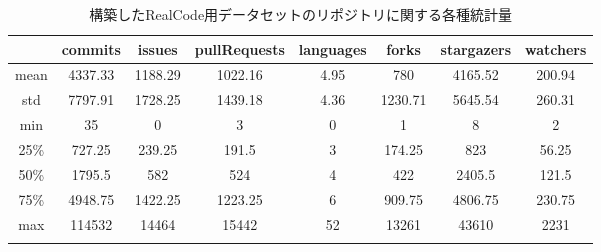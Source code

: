 \begin{table}[t]
  \centering
  \caption{構築したRealCode用データセットのリポジトリに関する各種統計量}
  \label{table:stats_repos}
    
  \begin{tabular}{c || c | c | c | c | c | c | c } \Xhline{3\arrayrulewidth}
        & commits & issues & pullRequests & languages & forks & stargazers & watchers \\ \hline
    mean & 4337.33 & 1188.29 & 1022.16 & 4.95 & 780 & 4165.52 & 200.94 \\
    std & 7797.91 & 1728.25 & 1439.18 & 4.36 & 1230.71 & 5645.54 & 260.31 \\
    min & 35 & 0 & 3 & 0 & 1 & 8 & 2 \\
    25\% & 727.25 & 239.25 & 191.5 & 3 & 174.25 & 823 & 56.25 \\
    50\% & 1795.5 & 582 & 524 & 4 & 422 & 2405.5 & 121.5 \\
    75\% & 4948.75 & 1422.25 & 1223.25 & 6 & 909.75 & 4806.75 & 230.75 \\
    max & 114532 & 14464 & 15442 & 52 & 13261 & 43610 & 2231 \\
    \Xhline{3\arrayrulewidth}
\end{tabular}
\end{table}


